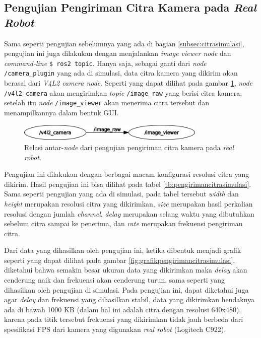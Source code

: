 \subsection{Pengujian Pengiriman Citra Kamera pada \emph{Real Robot}}
\label{subsec:citrarobot}

Sama seperti pengujian sebelumnya yang ada di bagian \ref{subsec:citrasimulasi},
  pengujian ini juga dilakukan dengan menjalankan \emph{image viewer node} dan \emph{command-line} \lstinline{$ ros2 topic}.
Hanya saja, sebagai ganti dari \emph{node} \lstinline{/camera_plugin} yang ada di simulasi,
  data citra kamera yang dikirim akan berasal dari \emph{V4L2 camera node}.
Seperti yang dapat dilihat pada gambar \ref{fig:rosgraphcamera},
  \emph{node} \lstinline{/v4l2_camera} akan mengirimkan \emph{topic} \lstinline{/image_raw} yang berisi citra kamera,
  setelah itu \emph{node} \lstinline{/image_viewer} akan menerima citra tersebut dan menampilkannya dalam bentuk GUI.

\begin{figure}[ht]
  \centering
  \includegraphics[width=0.8\textwidth,keepaspectratio]{gambar/rosgraph-camera.png}
  \caption{Relasi antar-\emph{node} dari pengujian pengiriman citra kamera pada \emph{real robot}.}
  \label{fig:rosgraphcamera}
\end{figure}

Pengujian ini dilakukan dengan berbagai macam konfigurasi resolusi citra yang dikirim.
Hasil pengujian ini bisa dilihat pada tabel \ref{tb:pengirimancitrasimulasi}.
Sama seperti pengujian yang ada di simulasi, pada tabel tersebut \emph{width} dan \emph{height} merupakan resolusi citra yang dikirimkan,
  \emph{size} merupakan hasil perkalian resolusi dengan jumlah \emph{channel},
  \emph{delay} merupakan selang waktu yang dibutuhkan sebelum citra sampai ke penerima,
  dan \emph{rate} merupakan frekuensi pengiriman citra.

  


Dari data yang dihasilkan oleh pengujian ini,
  ketika dibentuk menjadi grafik seperti yang dapat dilihat pada gambar \ref{fig:grafikpengirimancitrasimulasi},
  diketahui bahwa semakin besar ukuran data yang dikirimkan maka \emph{delay} akan cenderung naik dan frekuensi akan cenderung turun,
  sama seperti yang dihasilkan oleh pengujian di simulasi.
Pada pengujian ini, dapat diketahui juga agar \emph{delay} dan frekuensi yang dihasilkan stabil,
  data yang dikirimkan hendaknya ada di bawah 1000 KB (dalam hal ini adalah citra dengan resolusi 640x480),
  karena pada titik tersebut frekuensi yang dikirimkan tidak jauh berbeda dari spesifikasi FPS dari kamera yang digunakan \emph{real robot} (Logitech C922).
